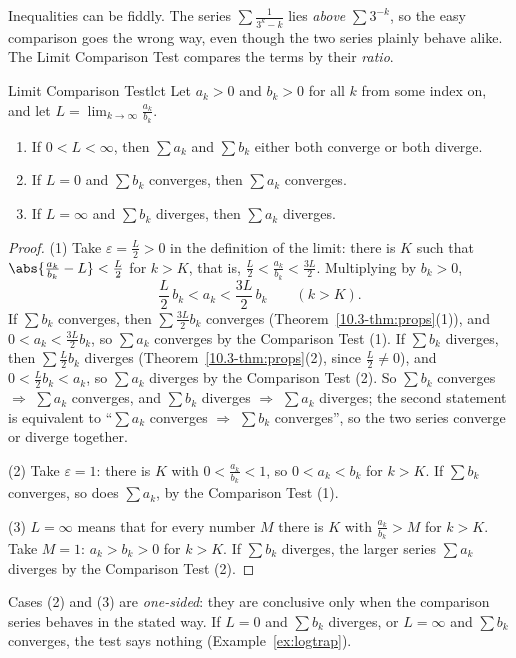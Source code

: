 \documentclass[11pt]{article}
\begin{document}
Inequalities can be fiddly. The series $\sum\frac1{3^k-k}$ lies \emph{above} $\sum3^{-k}$, so the easy comparison goes the wrong way, even though the two series plainly behave alike. The Limit Comparison Test compares the terms by their \emph{ratio}.

\begin{thm}{Limit Comparison Test}{lct}
Let $a_k>0$ and $b_k>0$ for all $k$ from some index on, and let $L=\displaystyle\lim_{k\to\infty}\frac{a_k}{b_k}$.
\begin{enumerate}[label=(\arabic*)]
  \item If $0<L<\infty$, then $\sum a_k$ and $\sum b_k$ either both converge or both diverge.
  \item If $L=0$ and $\sum b_k$ converges, then $\sum a_k$ converges.
  \item If $L=\infty$ and $\sum b_k$ diverges, then $\sum a_k$ diverges.
\end{enumerate}
\end{thm}
\begin{proof}
(1) Take $\varepsilon=\frac L2>0$ in the definition of the limit: there is $K$ such that $\abs{\frac{a_k}{b_k}-L}<\frac L2$ for $k>K$, that is, $\frac L2<\frac{a_k}{b_k}<\frac{3L}2$. Multiplying by $b_k>0$,
\[
\frac L2\,b_k<a_k<\frac{3L}2\,b_k\qquad(k>K).
\]
If $\sum b_k$ converges, then $\sum\frac{3L}2b_k$ converges (Theorem~\ref{10.3-thm:props}(1)), and $0<a_k<\frac{3L}2b_k$, so $\sum a_k$ converges by the Comparison Test (1). If $\sum b_k$ diverges, then $\sum\frac L2b_k$ diverges (Theorem~\ref{10.3-thm:props}(2), since $\frac L2\ne0$), and $0<\frac L2b_k<a_k$, so $\sum a_k$ diverges by the Comparison Test (2). So $\sum b_k$ converges $\Rightarrow$ $\sum a_k$ converges, and $\sum b_k$ diverges $\Rightarrow$ $\sum a_k$ diverges; the second statement is equivalent to ``$\sum a_k$ converges $\Rightarrow$ $\sum b_k$ converges'', so the two series converge or diverge together.

(2) Take $\varepsilon=1$: there is $K$ with $0<\frac{a_k}{b_k}<1$, so $0<a_k<b_k$ for $k>K$. If $\sum b_k$ converges, so does $\sum a_k$, by the Comparison Test (1).

(3) $L=\infty$ means that for every number $M$ there is $K$ with $\frac{a_k}{b_k}>M$ for $k>K$. Take $M=1$: $a_k>b_k>0$ for $k>K$. If $\sum b_k$ diverges, the larger series $\sum a_k$ diverges by the Comparison Test (2).
\end{proof}

Cases (2) and (3) are \emph{one-sided}: they are conclusive only when the comparison series behaves in the stated way. If $L=0$ and $\sum b_k$ diverges, or $L=\infty$ and $\sum b_k$ converges, the test says nothing (Example~\ref{ex:logtrap}).
\end{document}
